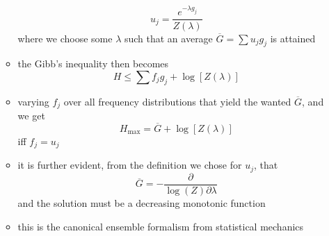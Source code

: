 \documentclass[../jaynes_prob_theory_notes.tex]{subfiles}
\begin{document}
\begin{itemize}
\begin{itemize}
\begin{equation*}
                                        u_j = \frac{e^{-{\lambda}g_j}}{Z(\lambda)}
                                    \end{equation*}
                                    where we choose some $\lambda$ such that an average $\overline{G} = \sum u_j g_j$ is attained
                                \item the Gibb's inequality then becomes
                                    \begin{equation*}
                                        H \leq \sum f_j g_j + \log \left[ Z(\lambda) \right]
                                    \end{equation*}
                                \item varying $f_j$ over all frequency distributions that yield the wanted $\overline{G}$, and we get
                                    \begin{equation*}
                                        H_{\max} = \overline{G} + \log \left[ Z(\lambda) \right]
                                    \end{equation*}
                                    iff $f_j = u_j$
                                \item it is further evident, from the definition we chose for $u_j$, that
                                    \begin{equation*}
                                        \overline{G} = - \frac{\partial}{\log (Z) \partial \lambda}
                                    \end{equation*}
                                    and the solution must be a decreasing monotonic function
                                \item this is the canonical ensemble formalism from statistical mechanics
                            \end{itemize}
                    \end{itemize}
\end{document}
